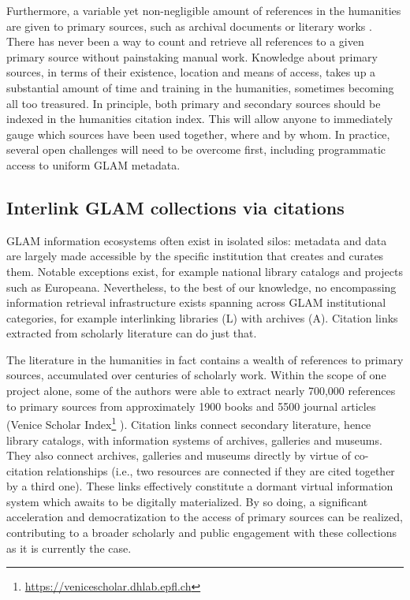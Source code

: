 Furthermore, a variable yet non-negligible amount of references in the humanities are given to primary sources, such as archival documents or literary works \cite{knievel_citation_2005}. There has never been a way to count and retrieve all references to a given primary source without painstaking manual work. Knowledge about primary sources, in terms of their existence, location and means of access, takes up a substantial amount of time and training in the humanities, sometimes becoming all too treasured. In principle, both primary and secondary sources should be indexed in the humanities citation index. This will allow anyone to immediately gauge which sources have been used together, where and by whom. In practice, several open challenges will need to be overcome first, including programmatic access to uniform GLAM metadata.

\subsection{Interlink GLAM collections via citations}\label{sec:interlinking-collections-via-citations}

GLAM information ecosystems often exist in isolated silos: metadata and data are largely made accessible by the specific institution that creates and curates them. Notable exceptions exist, for example national library catalogs and projects such as Europeana. Nevertheless, to the best of our knowledge, no encompassing information retrieval infrastructure exists spanning across GLAM institutional categories, for example interlinking libraries (L) with archives (A). Citation links extracted from scholarly literature can do just that.
 
The literature in the humanities in fact contains a wealth of references to primary sources, accumulated over centuries of scholarly work. Within the scope of one project alone, some of the authors were able to extract nearly 700,000 references to primary sources from approximately 1900 books and 5500 journal articles (Venice Scholar Index\footnote{\url{https://venicescholar.dhlab.epfl.ch}} \cite{colavizza_linked_2018}). Citation links connect secondary literature, hence library catalogs, with  information systems of archives, galleries and museums. They also connect archives, galleries and museums directly by virtue of co-citation relationships (i.e., two resources are connected if they are cited together by a third one). These links effectively constitute a dormant virtual information system which awaits to be digitally materialized. By so doing, a significant acceleration and democratization to the access of primary sources can be realized, contributing to a broader scholarly and public engagement with these collections as it is currently the case.
 
